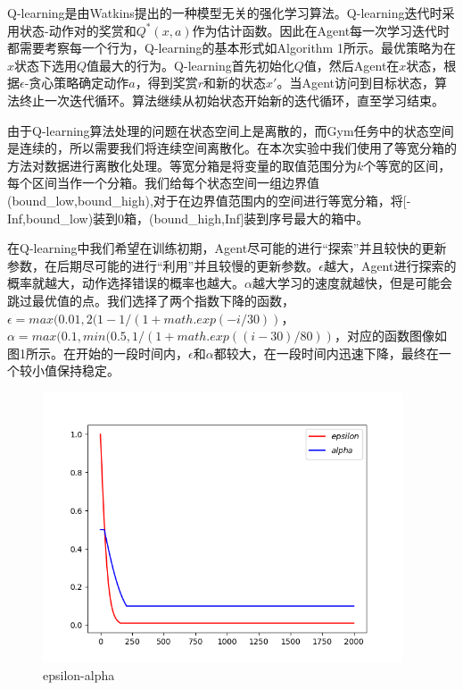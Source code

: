 \documentclass[a4paper,UTF8]{article}
\theoremstyle{definition}
\begin{document}
	Q-learning是由Watkins提出的一种模型无关的强化学习算法。Q-learning迭代时采用状态-动作对的奖赏和$Q^*(x,a)$作为估计函数。因此在Agent每一次学习迭代时都需要考察每一个行为，Q-learning的基本形式如Algorithm 1所示。最优策略为在$x$状态下选用$Q$值最大的行为。Q-learning首先初始化$Q$值，然后Agent在$x$状态，根据$\epsilon$-贪心策略确定动作$a$，得到奖赏$r$和新的状态$x'$。当Agent访问到目标状态，算法终止一次迭代循环。算法继续从初始状态开始新的迭代循环，直至学习结束。

	由于Q-learning算法处理的问题在状态空间上是离散的，而Gym任务中的状态空间是连续的，所以需要我们将连续空间离散化。在本次实验中我们使用了等宽分箱的方法对数据进行离散化处理。等宽分箱是将变量的取值范围分为$k$个等宽的区间，每个区间当作一个分箱。我们给每个状态空间一组边界值(bound\_low,bound\_high),对于在边界值范围内的空间进行等宽分箱，将[-Inf,bound\_low)装到0箱，(bound\_high,Inf]装到序号最大的箱中。

	在Q-learning中我们希望在训练初期，Agent尽可能的进行“探索”并且较快的更新参数，在后期尽可能的进行“利用”并且较慢的更新参数。$\epsilon$越大，Agent进行探索的概率就越大，动作选择错误的概率也越大。$\alpha$越大学习的速度就越快，但是可能会跳过最优值的点。我们选择了两个指数下降的函数，$\epsilon = max(0.01,2(1-1/(1+math.exp(-i/30))$，$\alpha=max(0.1,min(0.5,1/(1+math.exp((i-30)/80))$，对应的函数图像如图1所示。在开始的一段时间内，$\epsilon$和$\alpha$都较大，在一段时间内迅速下降，最终在一个较小值保持稳定。

\begin{figure}[!h]
\centering
\small
\includegraphics[height=8cm]{epsilon-alpha.png}
\caption{epsilon-alpha}
\end{figure}
\end{document}
